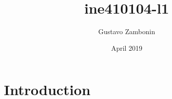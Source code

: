 \documentclass{article}
\title{ine410104-l1}
\author{Gustavo Zambonin}
\date{April 2019}
\begin{document}
\maketitle

\section{Introduction}
\end{document}
